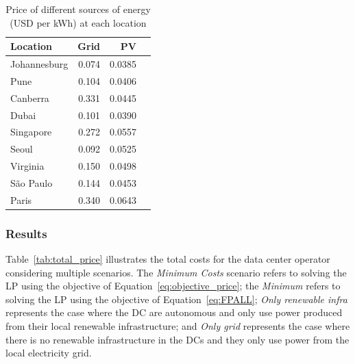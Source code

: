\begin{table}[H]
  
  \caption{Price of different sources of energy (USD per kWh) at each location }\label{tab:price_electricity_sources} \centering

  \begin{tabular}{|l|r|r|r|}
   \hline
    
  \textbf{Location} &   \textbf{Grid} & \textbf{PV}  \\
  \hline
  Johannesburg & 0.074 & 0.0385   \\
  \hline
  Pune      &  0.104   & 0.0406   \\
  \hline
  Canberra  & 0.331    &  0.0445  \\
  \hline
  Dubai   & 0.101      & 0.0390   \\
  \hline
  Singapore & 0.272    & 0.0557   \\
  \hline     
  Seoul      & 0.092   & 0.0525   \\
  \hline
  Virginia   & 0.150   &  0.0498  \\
  \hline
  São Paulo  & 0.144   &  0.0453  \\
  \hline 
  Paris      & 0.340   &  0.0643  \\
  \hline  

\end{tabular}
\end{table}

\subsubsection{Results}

Table~\ref{tab:total_price} illustrates the total costs for the data center operator considering multiple scenarios. The \textit{Minimum Costs} scenario refers to solving the LP using the objective of Equation~\eqref{eq:objective_price}; the \textit{Minimum } refers to solving the LP using  the objective of Equation~\eqref{eq:FPALL}; \textit{Only renewable infra} represents the case where the DC are autonomous and only use power produced from their local renewable infrastructure; and \textit{Only grid} represents the case where there is no renewable infrastructure in the DCs and they only use power from the local electricity grid.


